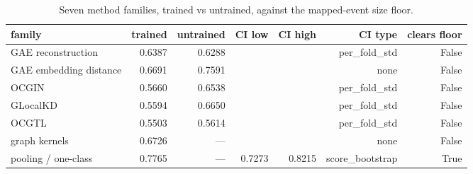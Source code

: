 \begin{table}[ht]
\centering
\caption{Seven method families, trained vs untrained, against the mapped-event size floor.}
\label{tab:t3-sweep}
\begin{tabular}{lrrrrrr}
\toprule
family & trained & untrained & CI low & CI high & CI type & clears floor \\
\midrule
GAE reconstruction & 0.6387 & 0.6288 &  &  & per\_fold\_std & False \\
GAE embedding distance & 0.6691 & 0.7591 &  &  & none & False \\
OCGIN & 0.5660 & 0.6538 &  &  & per\_fold\_std & False \\
GLocalKD & 0.5594 & 0.6650 &  &  & per\_fold\_std & False \\
OCGTL & 0.5503 & 0.5614 &  &  & per\_fold\_std & False \\
graph kernels & 0.6726 & --- &  &  & none & False \\
pooling / one-class & 0.7765 & --- & 0.7273 & 0.8215 & score\_bootstrap & True \\
\bottomrule
\end{tabular}
\end{table}
